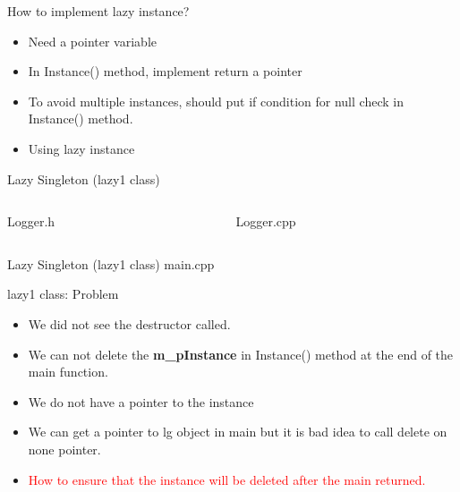 \documentclass[13pt]{beamer}
\begin{document}
\begin{frame}{How to implement lazy instance?}
\begin{itemize}
\setlength\itemsep{1em}

\item Need a pointer variable

\item In Instance() method, implement return a pointer

\item To avoid multiple instances, should put if condition for null check in Instance() method.

\item Using lazy instance

\end{itemize}
\end{frame}

\begin{frame}{Lazy Singleton (lazy1 class)}
\begin{columns}[T]
\begin{column}{.48\textwidth}
Logger.h
\lstset{basicstyle=\tiny,style=myCustomCppStyle}

\end{column}

\begin{column}{.48\textwidth}
Logger.cpp
\lstset{basicstyle=\tiny,style=myCustomCppStyle}

\end{column}
\end{columns}
\end{frame}

\begin{frame}{Lazy Singleton (lazy1 class)}
main.cpp
\lstset{basicstyle=\tiny,style=myCustomCppStyle}

\end{frame}

\begin{frame}{lazy1 class: Problem}
\begin{itemize}
\setlength\itemsep{1em}

\item We did not see the destructor called.

\item We can not delete the \textbf{m\_pInstance} in Instance() method at the end of the main function.

\item We do not have a pointer to the instance

\item We can get a pointer to lg object in main but it is bad idea to call delete on none pointer.

\item \textcolor{red}{How to ensure that the instance will be deleted after the main returned.}
\end{itemize}
\end{frame}
\end{document}
